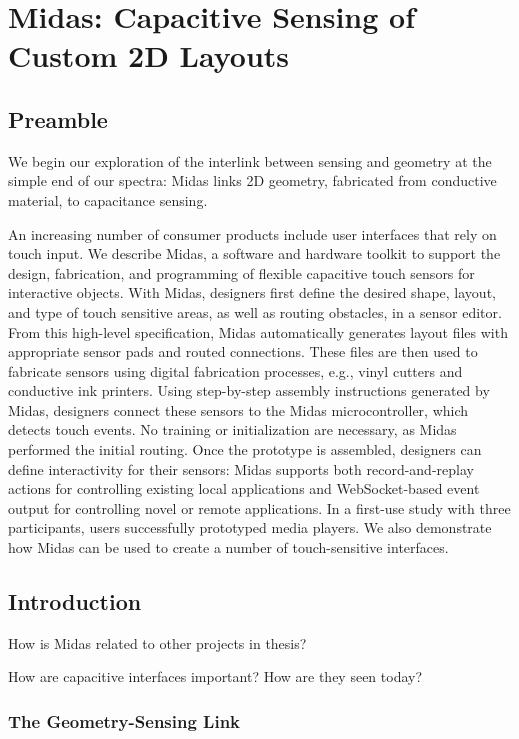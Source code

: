 \chapter{Midas: Capacitive Sensing of Custom 2D Layouts}

\section{Preamble}

We begin our exploration of the interlink between sensing and geometry at the simple end of our spectra: Midas links 2D geometry, fabricated from conductive material, to capacitance sensing.

An increasing number of consumer products include user interfaces that rely on touch input. We describe Midas, a software and hardware toolkit to support the design, fabrication, and programming of flexible capacitive touch sensors for interactive objects. With Midas, designers first define the desired shape, layout, and type of touch sensitive areas, as well as routing obstacles, in a sensor editor. From this high-level specification, Midas automatically generates layout files with appropriate sensor pads and routed connections. These files are then used to fabricate sensors using digital fabrication processes, e.g., vinyl cutters and conductive ink printers. Using step-by-step assembly instructions generated by Midas, designers connect these sensors to the Midas microcontroller, which detects touch events. No training or initialization are necessary, as Midas performed the initial routing. Once the prototype is assembled, designers can define interactivity for their sensors: Midas supports both record-and-replay actions for controlling existing local applications and WebSocket-based event output for controlling novel or remote applications. In a first-use study with three participants, users successfully prototyped media players. We also demonstrate how Midas can be used to create a number of touch-sensitive interfaces.

\section{Introduction}

How is Midas related to other projects in thesis?

How are capacitive interfaces important?  How are they seen today?

\subsection{The Geometry-Sensing Link}

